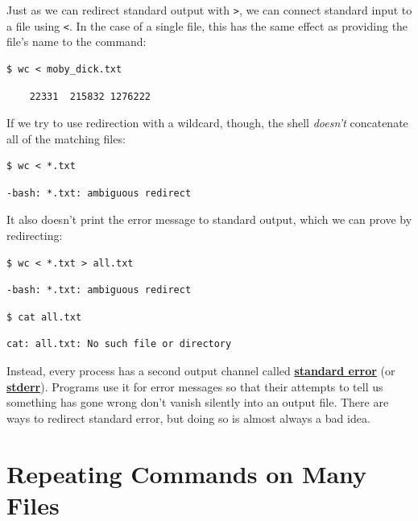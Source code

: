 \documentclass[
]{krantz}
\newcommand{\gref}[2]{\hyperlink{#2}{\textbf{#1}}}
\begin{document}
Just as we can redirect standard output with \texttt{\textgreater{}},
we can connect standard input to a file using \texttt{\textless{}}.
In the case of a single file,
this has the same effect as providing the file's name to the command:

\begin{verbatim}
$ wc < moby_dick.txt
\end{verbatim}

\begin{verbatim}
    22331  215832 1276222
\end{verbatim}

If we try to use redirection with a wildcard,
though,
the shell \emph{doesn't} concatenate all of the matching files:

\begin{verbatim}
$ wc < *.txt
\end{verbatim}

\begin{verbatim}
-bash: *.txt: ambiguous redirect
\end{verbatim}

It also doesn't print the error message to standard output,
which we can prove by redirecting:

\begin{verbatim}
$ wc < *.txt > all.txt
\end{verbatim}

\begin{verbatim}
-bash: *.txt: ambiguous redirect
\end{verbatim}

\begin{verbatim}
$ cat all.txt
\end{verbatim}

\begin{verbatim}
cat: all.txt: No such file or directory
\end{verbatim}

Instead,
every process has a second output channel called \gref{standard error}{stderr}
(or \gref{stderr}{stderr}).
Programs use it for error messages
so that their attempts to tell us something has gone wrong don't vanish silently into an output file.
There are ways to redirect standard error,
but doing so is almost always a bad idea.

\hypertarget{bash-tools-loops}{%
\section{Repeating Commands on Many Files}\label{bash-tools-loops}}
\end{document}
